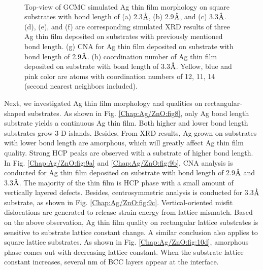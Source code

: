 \begin{figure}[!ht]
  \\
  \label{Chap:Ag/ZnO:fig:10g}
  \label{Chap:Ag/ZnO:fig:10h}
\caption[GCMC simulation results of Ag thin film morphology on square substrates.]{Top-view of \ac{GCMC} simulated Ag thin film morphology on square substrates with bond length of (a) 2.3$\mbox{\normalfont\AA}$, (b) 2.9$\mbox{\normalfont\AA}$, and (c) 3.3$\mbox{\normalfont\AA}$. (d), (e), and (f) are corresponding simulated \ac{XRD} results of three Ag thin film  deposited on substrates with previously mentioned bond length. (g) \ac{CNA} for Ag thin film deposited on substrate with bond length of 2.9$\mbox{\normalfont\AA}$. (h) coordination number of Ag thin film deposited on substrate with bond length of 3.3$\mbox{\normalfont\AA}$. Yellow, blue and pink color are atoms with coordination numbers of 12, 11, 14 (second nearest neighbors included).}
  \label{Chap:Ag/ZnO:fig10}
\end{figure}
\endgroup

Next, we investigated Ag thin film morphology and qualities on rectangular-shaped substrates. As shown in Fig. \ref{Chap:Ag/ZnO:fig8}, only Ag bond length substrate yields a continuous Ag thin film. Both higher and lower bond length substrates grow 3-D islands. Besides, From \ac{XRD} results, Ag grown on substrates with lower bond length are amorphous, which will greatly affect Ag thin film quality. Strong \ac{HCP} peaks are observed with a substrate of higher bond length. In Fig. \ref{Chap:Ag/ZnO:fig:9a} and \ref{Chap:Ag/ZnO:fig:9b}, \ac{CNA} analysis is conducted for Ag thin film deposited on substrate with bond length of 2.9$\mbox{\normalfont\AA}$ and 3.3$\mbox{\normalfont\AA}$. The majority of the thin film is \ac{HCP} phase with a small amount of vertically layered defects. Besides, centrosymmetric analysis is conducted for 3.3$\mbox{\normalfont\AA}$ substrate, as shown in Fig. \ref{Chap:Ag/ZnO:fig:9c}. Vertical-oriented misfit dislocations are generated to release strain energy from lattice mismatch. Based on the above observation, Ag thin film quality on rectangular lattice substrates is sensitive to substrate lattice constant change. A similar conclusion also applies to square lattice substrates. As shown in Fig. \ref{Chap:Ag/ZnO:fig:10d}, amorphous phase comes out with decreasing lattice constant. When the substrate lattice constant increases, several nm of \ac{BCC} layers appear at the interface. 

